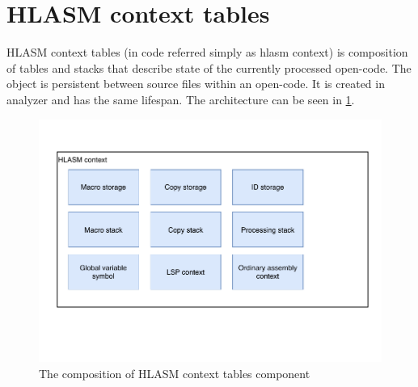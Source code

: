 \section{HLASM context tables}

HLASM context tables (in code referred simply as hlasm context) is composition of tables and stacks that describe state of the currently processed open-code. The object is persistent between source files within an open-code. It is created in analyzer and has the same lifespan. The architecture can be seen in \cref{fig06:hlasm}.

\begin{figure}
	\centering
	\includegraphics[width=\textwidth / 2]{img/hlasm_arch}
	\caption{The composition of HLASM context tables component}
	\label{fig06:hlasm}
\end{figure}